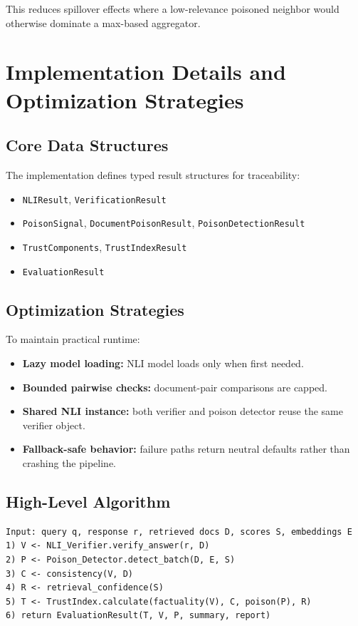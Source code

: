 This reduces spillover effects where a low-relevance poisoned neighbor would otherwise dominate a max-based aggregator.

\section{Implementation Details and Optimization Strategies}

\subsection{Core Data Structures}
The implementation defines typed result structures for traceability:
\begin{itemize}
    \item \texttt{NLIResult}, \texttt{VerificationResult}
    \item \texttt{PoisonSignal}, \texttt{DocumentPoisonResult}, \texttt{PoisonDetectionResult}
    \item \texttt{TrustComponents}, \texttt{TrustIndexResult}
    \item \texttt{EvaluationResult}
\end{itemize}

\subsection{Optimization Strategies}
To maintain practical runtime:
\begin{itemize}
    \item \textbf{Lazy model loading:} NLI model loads only when first needed.
    \item \textbf{Bounded pairwise checks:} document-pair comparisons are capped.
    \item \textbf{Shared NLI instance:} both verifier and poison detector reuse the same verifier object.
    \item \textbf{Fallback-safe behavior:} failure paths return neutral defaults rather than crashing the pipeline.
\end{itemize}

\subsection{High-Level Algorithm}
\begin{verbatim}
Input: query q, response r, retrieved docs D, scores S, embeddings E
1) V <- NLI_Verifier.verify_answer(r, D)
2) P <- Poison_Detector.detect_batch(D, E, S)
3) C <- consistency(V, D)
4) R <- retrieval_confidence(S)
5) T <- TrustIndex.calculate(factuality(V), C, poison(P), R)
6) return EvaluationResult(T, V, P, summary, report)
\end{verbatim}

